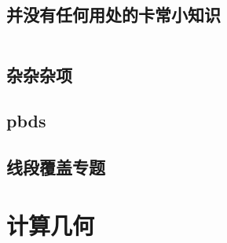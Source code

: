 \documentclass[a4paper,11pt]{article}
\begin{document}
    \subsection{并没有任何用处的卡常小知识}
    \inputminted[breaklines]{c++}{Others/并没有任何用处的卡常小知识.cpp}

    \subsection{杂杂杂项}
    

    \subsection{pbds}
    
    
     \subsection{线段覆盖专题}
    




    \newpage
    \section{计算几何}


\end{document}
